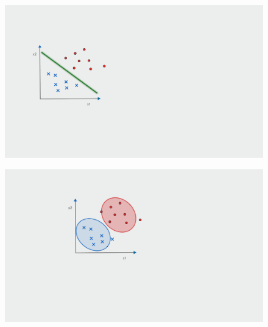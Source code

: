 \begin{figure}[h]
	\centering
	\begin{minipage}{.5\textwidth}
		\centering
		\includegraphics[trim = 4cm 8cm 24cm 6cm, clip = true, totalheight=0.26\textheight]{plots/Images/discriminative_model.pdf}
		\label{fig:test1}
	\end{minipage}%
	\begin{minipage}{.5\textwidth}
		\centering
		\includegraphics[trim =9.6cm 9.6cm 19cm 4cm, clip = true, totalheight=0.26\textheight]{plots/Images/generative_model.pdf}
		\label{fig:test2}
	\end{minipage}
\end{figure}
